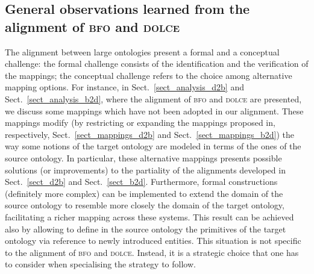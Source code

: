 \documentclass[ao]{iosart2x}
\newcommand{\nb}[1]{\textcolor{red}{$|$}\marginpar{\hspace*{-0cm}\parbox{20mm}{\scriptsize\raggedright\textcolor{red}{#1}}}}
\newcommand{\pr}[1]{\mathtt{#1}}
\newcommand{\cn}[1]{\mathtt{#1}}
\newcommand{\dolce}{{\textsc{dolce}}}
\newcommand{\bfo}{{\textsc{bfo}}}
\newcommand {\EDdcat} {\textsc{ed}}
\newcommand {\PDdcat} {\textsc{pd}}
\newcommand {\TPd} {\ensuremath{\pr{tP}}}
\newcommand {\Pd} {\ensuremath{\pr{P}}}
\newcommand{\cntbcat}{\cn{cnt}}
\newcommand{\occbcat}{\cn{occ}}
\newcommand{\bfocpart}{\pr{cP}}
\newcommand{\bfoopart}{\pr{oP}}
\begin{document}
\subsection{General observations learned from the alignment of {\bfo} and {\dolce}}
The alignment between large ontologies present a formal and a conceptual challenge: the formal challenge consists of the identification and the verification of the mappings; the conceptual challenge refers to the choice among alternative mapping options.
For instance, in Sect.~\ref{sect_analysis_d2b} and Sect.~\ref{sect_analysis_b2d}, where the alignment of {\bfo} and {\dolce} are presented, we discuss some mappings which have not been adopted in our alignment. These mappings modify (by restricting or expanding the mappings proposed in, respectively, Sect.~\ref{sect_mappings_d2b} and Sect.~\ref{sect_mappings_b2d}) the way some notions of the target ontology are modeled in terms of the ones of the source ontology. 
In particular, these alternative mappings presents possible solutions (or improvements) to the partiality of the alignments developed in Sect.~\ref{sect_d2b} and Sect.~\ref{sect_b2d}. Furthermore, formal constructions (definitely more complex) can be implemented to extend the domain of the source ontology to resemble more closely the domain of the target ontology, facilitating a richer mapping across these systems. This result can be achieved also by allowing to define in the source ontology the primitives of the target ontology via reference to newly introduced entities. This situation is not specific to the alignment of {\bfo} and {\dolce}. Instead, it is a strategic choice that one has to consider when specialising the strategy to follow.
 
\end{document}
